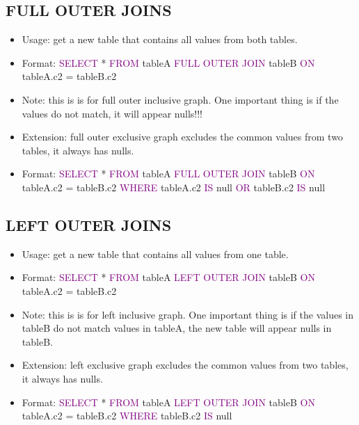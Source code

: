 \documentclass[a4paper]{article}
\begin{document}
\subsection{FULL OUTER JOINS}
\begin{itemize}
  \item Usage: get a new table that contains all values from both tables.
  \item Format: \textcolor{purple}{SELECT} * \textcolor{purple}{FROM} tableA \textcolor{purple}{FULL OUTER JOIN} tableB \textcolor{purple}{ON} tableA.c2 = tableB.c2
  \item Note:  this is is for full outer inclusive graph. One important thing is if the values do not match, it will appear nulls!!!
  \item Extension: full outer exclusive graph excludes the common values from two tables, it always has nulls.
  \item Format: \textcolor{purple}{SELECT} * \textcolor{purple}{FROM} tableA \textcolor{purple}{FULL OUTER JOIN} tableB \textcolor{purple}{ON} tableA.c2 = tableB.c2 \textcolor{purple}{WHERE} tableA.c2 \textcolor{purple}{IS} null \textcolor{purple}{OR} tableB.c2 \textcolor{purple}{IS} null
\end{itemize}

\subsection{LEFT OUTER JOINS}
\begin{itemize}
  \item Usage: get a new table that contains all values from one table.
  \item Format: \textcolor{purple}{SELECT} * \textcolor{purple}{FROM} tableA \textcolor{purple}{LEFT OUTER JOIN} tableB \textcolor{purple}{ON} tableA.c2 = tableB.c2
  \item Note:  this is is for left inclusive graph. One important thing is if the values in tableB do not match values in tableA, the new table will appear nulls in tableB.
  \item Extension: left exclusive graph excludes the common values from two tables, it always has nulls.
  \item Format: \textcolor{purple}{SELECT} * \textcolor{purple}{FROM} tableA \textcolor{purple}{LEFT OUTER JOIN} tableB \textcolor{purple}{ON} tableA.c2 = tableB.c2 \textcolor{purple}{WHERE} tableB.c2 \textcolor{purple}{IS} null 
\end{itemize}
\end{document}
